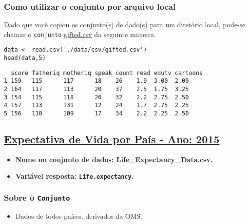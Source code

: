 \documentclass[11pt]{article}
\begin{document}
\subsubsection{Como utilizar o conjunto por arquivo local}
\label{sec:org8892ede}

Dado que você copiou os conjunto(s) de dado(s) para um diretório
local, pode-se chamar o \texttt{conjunto} \href{https://drive.google.com/file/d/1stukrpc\_Rqu-nlYZu\_-BFHNZec676\_BR/view?usp=sharing}{gifted.csv} da seguinte maneira.

\begin{verbatim}
data <- read.csv('./data/csv/gifted.csv')
head(data,5)
\end{verbatim}

\begin{verbatim}
  score fatheriq motheriq speak count read edutv cartoons
1 159   115      117      18    26    1.9  3.00  2.00    
2 164   117      113      20    37    2.5  1.75  3.25    
3 154   115      118      20    32    2.2  2.75  2.50    
4 157   113      131      12    24    1.7  2.75  2.25    
5 156   110      109      17    34    2.2  2.25  2.50    
\end{verbatim}
\clearpage

\subsection{\href{https://www.kaggle.com/augustus0498/life-expectancy-who}{Expectativa de Vida por País - Ano: 2015}}
\label{sec:org64d1146}
\begin{itemize}
\item \textbf{Nome no conjunto de dados: \textbf{Life_Expectancy_Data.csv}.}
\item \textbf{Variável resposta: \texttt{Life.expectancy}.}
\end{itemize}
\subsubsection{Sobre o \texttt{Conjunto}}
\label{sec:org73d255d}
\begin{itemize}
\item Dados de todos países, derivados da OMS.
\end{itemize}
\end{document}
